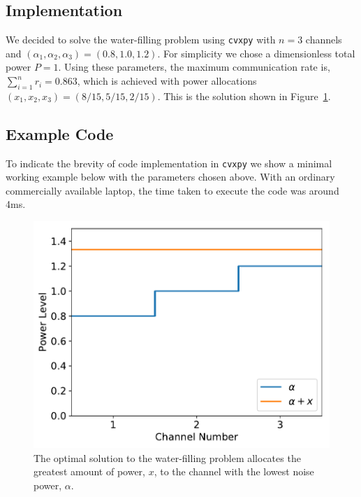 \documentclass[twocolumn,secnumarabic,amssymb, nobibnotes, aps, prl,superscriptaddress]{revtex4-1}
\begin{document}
\subsection{Implementation}
\noindent We decided to solve the water-filling problem using \texttt{cvxpy} with $n=3$ channels and $(\alpha_1,\alpha_2,\alpha_3) = (0.8,1.0,1.2)$.  For simplicity we chose a dimensionless total power $P=1$.  Using these parameters, the maximum communication rate is, $\sum_{i=1}^{n}r_i = 0.863$, which is achieved with power allocations $(x_1,x_2,x_3) = (8/15,5/15,2/15)$.  This is the solution shown in Figure~\ref{fig:waterfilling}.

\subsection{Example Code}
\noindent To indicate the brevity of code implementation in \texttt{cvxpy} we show a minimal working example below with the parameters chosen above.  With an ordinary commercially available laptop, the time taken to execute the code was around 4ms.


\begin{figure}[H]
\centering
\includegraphics[width=1.0\linewidth]{water_filling_plot.pdf}
\caption{The optimal solution to the water-filling problem allocates the greatest amount of power, $x$, to the channel with the lowest noise power, $\alpha$.}
\label{fig:waterfilling}
\end{figure}
\end{document}
